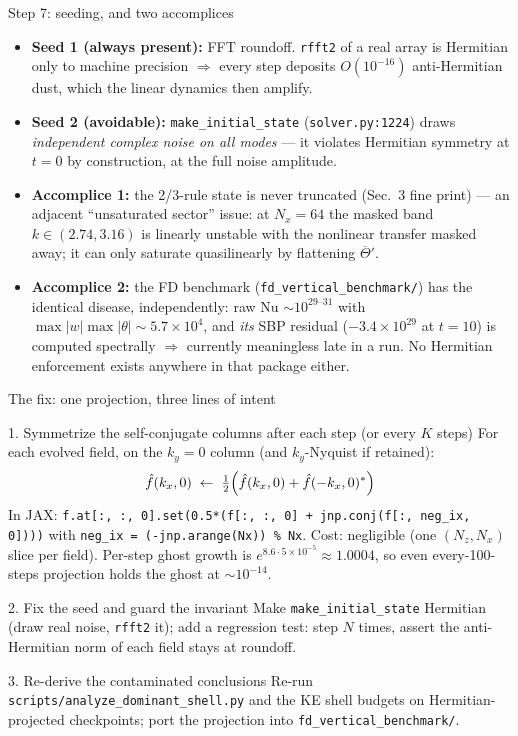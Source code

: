 \documentclass[aspectratio=169,10pt]{beamer}
\newcommand{\Tb}{\overline{\Theta}}
\newcommand{\file}[1]{\textcolor{blue!60!black}{\texttt{#1}}}
\begin{document}
\begin{frame}{Step 7: seeding, and two accomplices}
  \begin{itemize}
    \item \textbf{Seed 1 (always present):} FFT roundoff. \texttt{rfft2} of a real
      array is Hermitian only to machine precision $\Rightarrow$ every step deposits
      $O(10^{-16})$ anti-Hermitian dust, which the linear dynamics then amplify.
    \item \textbf{Seed 2 (avoidable):} \texttt{make\_initial\_state}
      (\file{solver.py:1224}) draws \emph{independent complex noise on all modes} ---
      it violates Hermitian symmetry at $t=0$ by construction, at the full noise
      amplitude.
    \item \textbf{Accomplice 1:} the 2/3-rule state is never truncated (Sec.~3
      fine print) --- an adjacent ``unsaturated sector'' issue: at $N_x{=}64$ the
      masked band $k\in(2.74,3.16)$ is linearly unstable with the nonlinear transfer
      masked away; it can only saturate quasilinearly by flattening $\Tb'$.
    \item \textbf{Accomplice 2:} the FD benchmark (\file{fd\_vertical\_benchmark/})
      has the identical disease, independently: raw Nu $\sim10^{29\text{--}31}$ with
      $\max|w|\max|\theta| \sim 5.7\times10^{4}$, and \emph{its} SBP residual
      ($-3.4\times10^{29}$ at $t{=}10$) is computed spectrally $\Rightarrow$
      currently meaningless late in a run. No Hermitian enforcement exists anywhere
      in that package either.
  \end{itemize}
\end{frame}

\begin{frame}{The fix: one projection, three lines of intent}
  \begin{block}{1. Symmetrize the self-conjugate columns after each step (or every $K$ steps)}
    For each evolved field, on the $k_y{=}0$ column (and $k_y$-Nyquist if retained):
    \[
      \hat f(k_x, 0) \;\leftarrow\; \tfrac12\Bigl(\hat f(k_x,0) + \hat f(-k_x,0)^{*}\Bigr)
    \]
    \footnotesize In JAX: \texttt{f.at[:, :, 0].set(0.5*(f[:, :, 0] + jnp.conj(f[:, neg\_ix, 0])))}
    with \texttt{neg\_ix = (-jnp.arange(Nx)) \% Nx}. Cost: negligible (one
    $(N_z,N_x)$ slice per field). Per-step ghost growth is
    $e^{8.6\cdot 5\times10^{-5}} \approx 1.0004$, so even every-100-steps projection
    holds the ghost at $\sim10^{-14}$.
  \end{block}
  \begin{block}{2. Fix the seed and guard the invariant}
    Make \texttt{make\_initial\_state} Hermitian (draw real noise, \texttt{rfft2} it);
    add a regression test: step $N$ times, assert the anti-Hermitian norm of each
    field stays at roundoff.
  \end{block}
  \begin{block}{3. Re-derive the contaminated conclusions}
    Re-run \file{scripts/analyze\_dominant\_shell.py} and the KE shell budgets on
    Hermitian-projected checkpoints; port the projection into \file{fd\_vertical\_benchmark/}.
  \end{block}
\end{frame}
\end{document}
